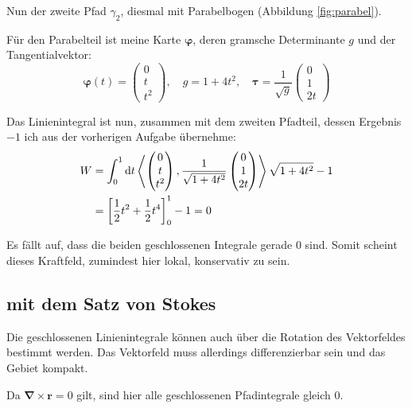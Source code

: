 \documentclass[11pt, ngerman, fleqn]{article}
\newcommand{\half}{\frac 12}
\newcommand{\inner}[2]{\left\langle #1, #2 \right\rangle}
\newcommand{\vnabla}{\vec \nabla}
\renewcommand{\vec}[1]{\boldsymbol{#1}}
\begin{document}
	Nun der zweite Pfad $\gamma_2$, diesmal mit Parabelbogen (Abbildung \ref{fig:parabel}).

	Für den Parabelteil ist meine Karte $\vec\varphi$, deren gramsche
	Determinante $g$ und der Tangentialvektor:
	\[
		\vec\varphi(t) = \begin{pmatrix}
			0 \\ t \\ t^2
		\end{pmatrix}
		, \quad
		g = 1 + 4t^2
		, \quad
		\vec \tau = \frac 1{\sqrt{g}} \begin{pmatrix}
			0 \\ 1 \\ 2t
		\end{pmatrix}
	\]

	Das Linienintegral ist nun, zusammen mit dem zweiten Pfadteil, dessen Ergebnis $-1$ ich aus der vorherigen Aufgabe übernehme:
	\begin{align*}
		W
		&= \int_0^1 \dif t \inner{\begin{pmatrix}
		0 \\ t \\ t^2
\end{pmatrix}}{\frac 1{\sqrt{1+4t^2}} \begin{pmatrix}
		0 \\ 1 \\ 2t
\end{pmatrix}} \sqrt{1+4t^2} - 1 \\
&= \sbr{\half t^2 + \half t^4}_0^1 - 1 = 0
\end{align*}

Es fällt auf, dass die beiden geschlossenen Integrale gerade 0 sind. Somit scheint dieses Kraftfeld, zumindest hier lokal, konservativ zu sein.

\subsection{mit dem Satz von Stokes}

Die geschlossenen Linienintegrale können auch über die Rotation des
Vektorfeldes bestimmt werden. Das Vektorfeld muss allerdings differenzierbar
sein und das Gebiet kompakt.

Da $\vnabla \times \vec r = 0$ gilt, sind hier alle geschlossenen Pfadintegrale
gleich 0.

\end{document}
